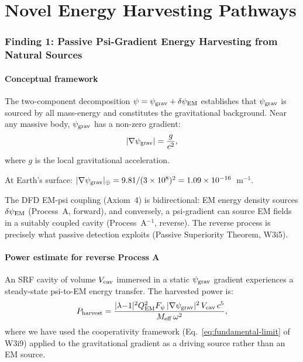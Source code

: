 \documentclass[11pt]{article}
\newcommand{\ee}[1]{\times 10^{#1}}
\newcommand{\psigrav}{\psi_{\rm grav}}
\newcommand{\dpsiEM}{\delta\psi_{\rm EM}}
\newcommand{\Meff}{M_{\rm eff}}
\newcommand{\lambdaone}{|\lambda{-}1|}
\newcommand{\QEM}{Q_{\rm EM}}
\newcommand{\Fpsi}{F_\psi}
\begin{document}
\part{Novel Energy Harvesting Pathways}
\label{part:harvesting}

\section{Finding 1: Passive Psi-Gradient Energy Harvesting from Natural Sources}
\label{sec:psi-gradient-harvest}

\subsection{Conceptual framework}

The two-component decomposition $\psi = \psigrav + \dpsiEM$ establishes that
$\psigrav$ is sourced by all mass-energy and constitutes the gravitational
background. Near any massive body, $\psigrav$ has a non-zero gradient:
\begin{equation}
|\nabla\psigrav| = \frac{g}{c^2},
\label{eq:psi-gradient-earth}
\end{equation}
where $g$ is the local gravitational acceleration.

At Earth's surface: $|\nabla\psigrav|_\oplus = 9.81/(3\ee{8})^2 =
1.09\ee{-16}$~m$^{-1}$.

The DFD EM-psi coupling (Axiom~4) is bidirectional: EM energy density sources
$\dpsiEM$ (Process~A, forward), and conversely, a psi-gradient can source EM
fields in a suitably coupled cavity (Process~A$^{-1}$, reverse). The reverse
process is precisely what passive detection exploits (Passive Superiority
Theorem, W3i5).

\subsection{Power estimate for reverse Process A}

An SRF cavity of volume $V_{\rm cav}$ immersed in a static $\psigrav$ gradient
experiences a steady-state psi-to-EM energy transfer. The harvested power is:
\begin{equation}
P_{\rm harvest} = \frac{\lambdaone^2 \QEM^2 \Fpsi\, |\nabla\psigrav|^2\,
V_{\rm cav}\, c^5}{\Meff\, \omega^2},
\label{eq:P-harvest}
\end{equation}
where we have used the cooperativity framework (Eq.~\ref{eq:fundamental-limit}
of W3i9) applied to the gravitational gradient as a driving source rather than
an EM source.
\end{document}
